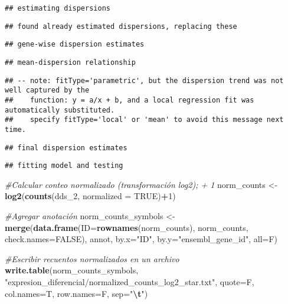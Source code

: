\documentclass[
]{article}
\newenvironment{Shaded}{\begin{snugshade}}{\end{snugshade}}
\newcommand{\AttributeTok}[1]{\textcolor[rgb]{0.13,0.29,0.53}{#1}}
\newcommand{\CommentTok}[1]{\textcolor[rgb]{0.56,0.35,0.01}{\textit{#1}}}
\newcommand{\ConstantTok}[1]{\textcolor[rgb]{0.56,0.35,0.01}{#1}}
\newcommand{\DecValTok}[1]{\textcolor[rgb]{0.00,0.00,0.81}{#1}}
\newcommand{\FunctionTok}[1]{\textcolor[rgb]{0.13,0.29,0.53}{\textbf{#1}}}
\newcommand{\NormalTok}[1]{#1}
\newcommand{\OtherTok}[1]{\textcolor[rgb]{0.56,0.35,0.01}{#1}}
\newcommand{\SpecialCharTok}[1]{\textcolor[rgb]{0.81,0.36,0.00}{\textbf{#1}}}
\newcommand{\StringTok}[1]{\textcolor[rgb]{0.31,0.60,0.02}{#1}}
\begin{document}
\begin{verbatim}
## estimating dispersions
\end{verbatim}

\begin{verbatim}
## found already estimated dispersions, replacing these
\end{verbatim}

\begin{verbatim}
## gene-wise dispersion estimates
\end{verbatim}

\begin{verbatim}
## mean-dispersion relationship
\end{verbatim}

\begin{verbatim}
## -- note: fitType='parametric', but the dispersion trend was not well captured by the
##    function: y = a/x + b, and a local regression fit was automatically substituted.
##    specify fitType='local' or 'mean' to avoid this message next time.
\end{verbatim}

\begin{verbatim}
## final dispersion estimates
\end{verbatim}

\begin{verbatim}
## fitting model and testing
\end{verbatim}

\begin{Shaded}
\begin{Highlighting}[]
\CommentTok{\#Calcular conteo normalizado (transformación log2); + 1}
\NormalTok{norm\_counts }\OtherTok{\textless{}{-}} \FunctionTok{log2}\NormalTok{(}\FunctionTok{counts}\NormalTok{(dds\_2, }\AttributeTok{normalized =} \ConstantTok{TRUE}\NormalTok{)}\SpecialCharTok{+}\DecValTok{1}\NormalTok{)}

\CommentTok{\#Agregar anotación}
\NormalTok{norm\_counts\_symbols }\OtherTok{\textless{}{-}} \FunctionTok{merge}\NormalTok{(}\FunctionTok{data.frame}\NormalTok{(}\AttributeTok{ID=}\FunctionTok{rownames}\NormalTok{(norm\_counts), norm\_counts, }\AttributeTok{check.names=}\ConstantTok{FALSE}\NormalTok{), annot, }\AttributeTok{by.x=}\StringTok{"ID"}\NormalTok{, }\AttributeTok{by.y=}\StringTok{"ensembl\_gene\_id"}\NormalTok{, }\AttributeTok{all=}\NormalTok{F)}

\CommentTok{\#Escribir recuentos normalizados en un archivo}
\FunctionTok{write.table}\NormalTok{(norm\_counts\_symbols, }\StringTok{"expresion\_diferencial/normalized\_counts\_log2\_star.txt"}\NormalTok{, }\AttributeTok{quote=}\NormalTok{F, }\AttributeTok{col.names=}\NormalTok{T, }\AttributeTok{row.names=}\NormalTok{F, }\AttributeTok{sep=}\StringTok{"}\SpecialCharTok{\textbackslash{}t}\StringTok{"}\NormalTok{)}
\end{Highlighting}
\end{Shaded}
\end{document}
